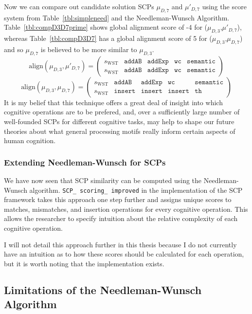 Now we can compare out candidate solution SCPs $\mu_{D,7}$ and $\mu'_{D,7}$ using the score system from Table~\ref{tbl:simpleneed} and the Needleman-Wunsch Algorithm. Table~\ref{tbl:compD3D7prime} shows global alignment score of -4 for ($\mu_{D,3}$,$\mu'_{D,7}$), whereas Table~\ref{tbl:compD3D7} has a global alignment score of 5 for ($\mu_{D,3}$,$\mu_{D,7}$) and so $\mu_{D,7}$ is believed to be more similar to $\mu_{D,3}$.
\[
\text{align}(\mu_{D,3},\mu'_{D,7}) =
\begin{pmatrix}
s_\text{WST} & \texttt{addAB} & \texttt{addExp} & \texttt{wc} & \texttt{semantic} \\
s_\text{WST} & \texttt{addAB} & \texttt{addExp} & \texttt{wc} & \texttt{semantic}
\end{pmatrix}
\]
\[
\text{align}(\mu_{D,3},\mu_{D,7}) =
\begin{pmatrix}
s_\text{WST} & \texttt{addAB} & \texttt{addExp} & \texttt{wc} & \texttt{semantic} \\
s_\text{WST} & \texttt{insert} & \texttt{insert} & \texttt{insert} & \texttt{th}
\end{pmatrix}
\]
It is my belief that this technique offers a great deal of insight into which cognitive operations are to be prefered, and, over a sufficiently large number of well-founded SCPs for different cognitive tasks, may help to shape our future theories about what general processing motifs really inform certain aspects of human cognition.

\subsubsection{Extending Needleman-Wunsch for SCPs}

We have now seen that SCP similarity can be computed using the Needleman-Wunsch algorithm. \texttt{SCP\_ scoring\_ improved} in the implementation of the SCP framework takes this approach one step further and assigns unique scores to matches, mismatches, and insertion operations for every cognitive operation. This allows the researcher to specify intuition about the relative complexity of each cognitive operation. 

I will not detail this approach further in this thesis because I do not currently have an intuition as to how these scores should be calculated for each operation, but it is worth noting that the implementation exists.

\subsection{Limitations of the Needleman-Wunsch Algorithm}

